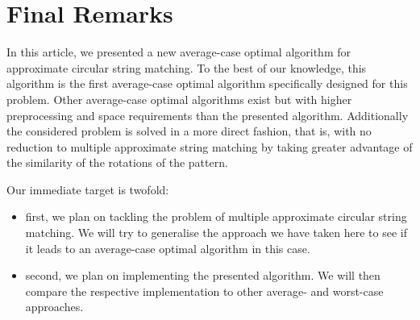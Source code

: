 \documentclass[runningheads, envcountsame, a4paper]{llncs}\usepackage{etex}
\begin{document}
\section{Final Remarks}

In this article, we presented a new average-case optimal algorithm for approximate circular string matching. 
To the best of our knowledge, this algorithm is the first average-case optimal algorithm specifically designed for this problem. 
Other average-case optimal algorithms exist but with higher preprocessing and space requirements than the presented algorithm. 
Additionally the considered problem is solved in a more direct fashion, that is, with no reduction to multiple approximate string matching 
by taking greater advantage of the similarity of the rotations of the pattern. 

\noindent Our immediate target is twofold: 
\begin{itemize}
\item first, we plan on tackling the problem of multiple approximate circular string matching. We will try to generalise the approach we have taken here to see if it leads to an average-case optimal 
algorithm in this case. 
\item second, we plan on implementing the presented algorithm. We will then compare the respective implementation to other average- and worst-case approaches.
\end{itemize}



\end{document}
